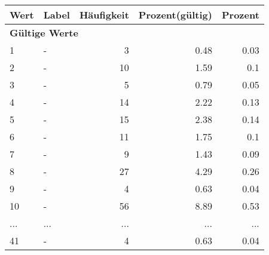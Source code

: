      \begin{longtable}{lXrrr}
     \toprule
     \textbf{Wert} & \textbf{Label} & \textbf{Häufigkeit} & \textbf{Prozent(gültig)} & \textbf{Prozent} \\
     \endhead
     \midrule
     \multicolumn{5}{l}{\textbf{Gültige Werte}}\\
        1 & \multicolumn{1}{X}{-} & %
          \num{3} &
          \num[round-mode=places,round-precision=2]{0,48} &
          \num[round-mode=places,round-precision=2]{0,03} \\
        2 & \multicolumn{1}{X}{-} & %
          \num{10} &
          \num[round-mode=places,round-precision=2]{1,59} &
          \num[round-mode=places,round-precision=2]{0,1} \\
        3 & \multicolumn{1}{X}{-} & %
          \num{5} &
          \num[round-mode=places,round-precision=2]{0,79} &
          \num[round-mode=places,round-precision=2]{0,05} \\
        4 & \multicolumn{1}{X}{-} & %
          \num{14} &
          \num[round-mode=places,round-precision=2]{2,22} &
          \num[round-mode=places,round-precision=2]{0,13} \\
        5 & \multicolumn{1}{X}{-} & %
          \num{15} &
          \num[round-mode=places,round-precision=2]{2,38} &
          \num[round-mode=places,round-precision=2]{0,14} \\
        6 & \multicolumn{1}{X}{-} & %
          \num{11} &
          \num[round-mode=places,round-precision=2]{1,75} &
          \num[round-mode=places,round-precision=2]{0,1} \\
        7 & \multicolumn{1}{X}{-} & %
          \num{9} &
          \num[round-mode=places,round-precision=2]{1,43} &
          \num[round-mode=places,round-precision=2]{0,09} \\
        8 & \multicolumn{1}{X}{-} & %
          \num{27} &
          \num[round-mode=places,round-precision=2]{4,29} &
          \num[round-mode=places,round-precision=2]{0,26} \\
        9 & \multicolumn{1}{X}{-} & %
          \num{4} &
          \num[round-mode=places,round-precision=2]{0,63} &
          \num[round-mode=places,round-precision=2]{0,04} \\
        10 & \multicolumn{1}{X}{-} & %
          \num{56} &
          \num[round-mode=places,round-precision=2]{8,89} &
          \num[round-mode=places,round-precision=2]{0,53} \\
       ... & ... & ... & ... & ... \\
        41 & \multicolumn{1}{X}{-} & %
          \num{4} &
          \num[round-mode=places,round-precision=2]{0,63} &
          \num[round-mode=places,round-precision=2]{0,04} \\


\end{longtable}

